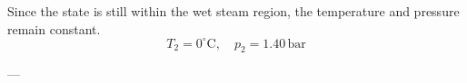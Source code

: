 Since the state is still within the wet steam region, the temperature and pressure remain constant.  
\[
T_2 = 0^\circ\text{C}, \quad p_2 = 1.40 \, \text{bar}
\]

---